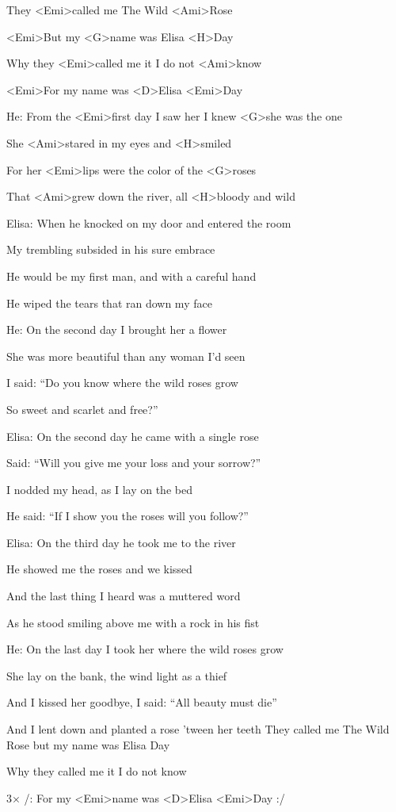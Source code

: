 
\zr
They <Emi>called me The Wild <Ami>Rose

<Emi>But my <G>name was Elisa <H>Day

Why they <Emi>called me it I do not <Ami>know

<Emi>For my name was <D>Elisa <Emi>Day
\kr

He:
\zs
From the <Emi>first day I saw her I knew <G>she was the one 

She <Ami>stared in my eyes and <H>smiled

For her <Emi>lips were the color of the <G>roses 

That <Ami>grew down the river, all <H>bloody and wild
\ks

Elisa:
\zs
When he knocked on my door and entered the room

My trembling subsided in his sure embrace

He would be my first man, and with a careful hand

He wiped the tears that ran down my face
\ks

\zr \kr

He:
\zs
On the second day I brought her a flower

She was more beautiful than any woman I'd seen

I said: ``Do you know where the wild roses grow

So sweet and scarlet and free?''
\ks


Elisa:
\zs
On the second day he came with a single rose

Said: ``Will you give me your loss and your sorrow?''

I nodded my head, as I lay on the bed

He said: ``If I show you the roses will you follow?''
\ks

\zr \kr

Elisa:
\zs
On the third day he took me to the river

He showed me the roses and we kissed

And the last thing I heard was a muttered word

As he stood smiling above me with a rock in his fist 
\ks

He:
\zs
On the last day I took her where the wild roses grow

She lay on the bank, the wind light as a thief

And I kissed her goodbye, I said: ``All beauty must die''

And I lent down and planted a rose 'tween her teeth 
\ks
\zr
They called me The Wild Rose but my name was Elisa Day

Why they called me it I do not know

3× /: For my <Emi>name was <D>Elisa <Emi>Day :/
\kr

\kp
